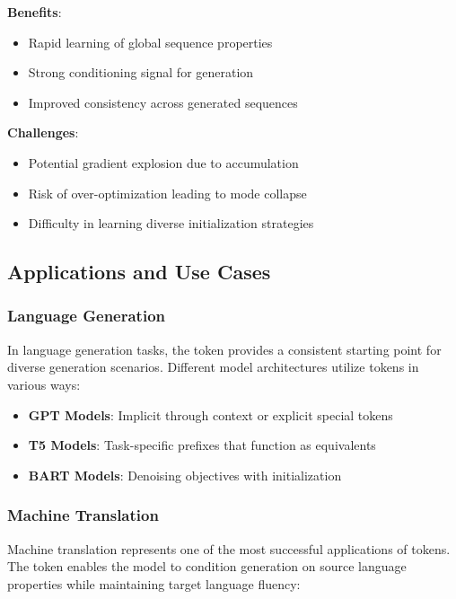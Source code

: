 \textbf{Benefits}:
\begin{itemize}
\item Rapid learning of global sequence properties
\item Strong conditioning signal for generation
\item Improved consistency across generated sequences
\end{itemize}

\textbf{Challenges}:
\begin{itemize}
\item Potential gradient explosion due to accumulation
\item Risk of over-optimization leading to mode collapse
\item Difficulty in learning diverse initialization strategies
\end{itemize}

\subsection{Applications and Use Cases}

\subsubsection{Language Generation}

In language generation tasks, the \sos{} token provides a consistent starting point for diverse generation scenarios. Different model architectures utilize \sos{} tokens in various ways:

\begin{itemize}
\item \textbf{GPT Models}: Implicit \sos{} through context or explicit special tokens
\item \textbf{T5 Models}: Task-specific prefixes that function as \sos{} equivalents
\item \textbf{BART Models}: Denoising objectives with \sos{} initialization
\end{itemize}

\subsubsection{Machine Translation}

Machine translation represents one of the most successful applications of \sos{} tokens. The token enables the model to condition generation on source language properties while maintaining target language fluency:

